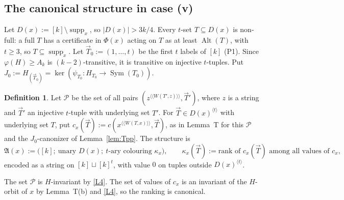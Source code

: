 \documentclass[11pt]{article}
\theoremstyle{plain}
\theoremstyle{definition}
\newtheorem{definition}[theorem]{Definition}
\theoremstyle{remark}
\theoremstyle{named}
\theoremstyle{namedrm}
\newcommand{\Sym}{\operatorname{Sym}}
\newcommand{\Alt}{\operatorname{Alt}}
\newcommand{\supp}{\operatorname{supp}}
\newcommand{\fA}{\mathfrak{A}}
\newcommand{\vT}{\vec{T}}
\newcommand{\lay}[2]{#1^{\langle\!\langle #2\rangle\!\rangle}}
\begin{document}
\subsection{The canonical structure in case (v)}\label{sec:colours}

Let $D(x):=[k]\setminus\supp_x$, so $|D(x)|>3k/4$. Every $t$-set $T\subseteq D(x)$ is non-full: a full $T$ has a
certificate in $\Phi(x)$ acting on $T$ as at least $\Alt(T)$, with $t\ge3$, so $T\subseteq\supp_x$. Let
$\vT_0:=(1,\dots,t)$ be the first $t$ labels of $[k]$ (P1). Since $\varphi(H)\ge A_k$ is $(k-2)$-transitive, it
is transitive on injective $t$-tuples. Put $J_0:=H_{(\vT_0)}=\ker(\psi_{T_0}\colon H_{T_0}\to\Sym(T_0))$.

\begin{definition}\label{def:Ax}
Let $\mathcal P$ be the set of all pairs $(\lay{z}{W(T',z)},\vT')$, where $z$ is a string and $\vT'$ an
injective $t$-tuple with underlying set $T'$. For $\vT\in D(x)^{\langle t\rangle}$ with underlying set $T$, put
$c_x(\vT):=c(\lay{x}{W(T,x)},\vT)$, as in Lemma~T for this $\mathcal P$ and the $J_0$-canonizer of
Lemma~\ref{lem:Tpp}. The structure is
\[ \fA(x):=\big([k];\ \text{unary }D(x);\ \text{$t$-ary colouring }\kappa_x\big),\qquad
   \kappa_x(\vT):=\text{rank of }c_x(\vT)\text{ among all values of }c_x, \]
encoded as a string on $[k]\sqcup[k]^t$, with value $0$ on tuples outside $D(x)^{\langle t\rangle}$.
\end{definition}
The set $\mathcal P$ is $H$-invariant by \ref{L4}. The set of values of $c_x$ is an invariant of the
$H$-orbit of $x$ by Lemma~T(b) and \ref{L4}, so the ranking is canonical.
\end{document}
